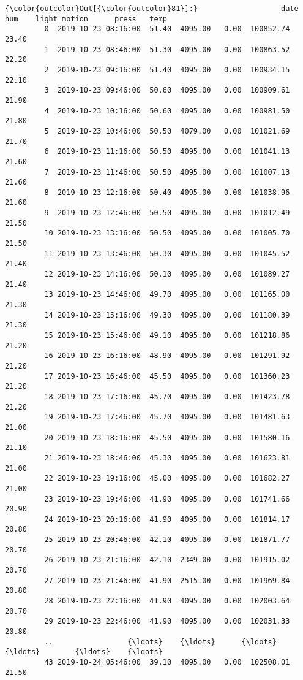 \documentclass[11pt]{article}
\begin{document}
            \begin{Verbatim}[commandchars=\\\{\}]
{\color{outcolor}Out[{\color{outcolor}81}]:}                   date    hum    light motion      press   temp
         0  2019-10-23 08:16:00  51.40  4095.00   0.00  100852.74  23.40
         1  2019-10-23 08:46:00  51.30  4095.00   0.00  100863.52  22.20
         2  2019-10-23 09:16:00  51.40  4095.00   0.00  100934.15  22.10
         3  2019-10-23 09:46:00  50.60  4095.00   0.00  100909.61  21.90
         4  2019-10-23 10:16:00  50.60  4095.00   0.00  100981.50  21.80
         5  2019-10-23 10:46:00  50.50  4079.00   0.00  101021.69  21.70
         6  2019-10-23 11:16:00  50.50  4095.00   0.00  101041.13  21.60
         7  2019-10-23 11:46:00  50.50  4095.00   0.00  101007.13  21.60
         8  2019-10-23 12:16:00  50.40  4095.00   0.00  101038.96  21.60
         9  2019-10-23 12:46:00  50.50  4095.00   0.00  101012.49  21.50
         10 2019-10-23 13:16:00  50.50  4095.00   0.00  101005.70  21.50
         11 2019-10-23 13:46:00  50.30  4095.00   0.00  101045.52  21.40
         12 2019-10-23 14:16:00  50.10  4095.00   0.00  101089.27  21.40
         13 2019-10-23 14:46:00  49.70  4095.00   0.00  101165.00  21.30
         14 2019-10-23 15:16:00  49.30  4095.00   0.00  101180.39  21.30
         15 2019-10-23 15:46:00  49.10  4095.00   0.00  101218.86  21.20
         16 2019-10-23 16:16:00  48.90  4095.00   0.00  101291.92  21.20
         17 2019-10-23 16:46:00  45.50  4095.00   0.00  101360.23  21.20
         18 2019-10-23 17:16:00  45.70  4095.00   0.00  101423.78  21.20
         19 2019-10-23 17:46:00  45.70  4095.00   0.00  101481.63  21.00
         20 2019-10-23 18:16:00  45.50  4095.00   0.00  101580.16  21.10
         21 2019-10-23 18:46:00  45.30  4095.00   0.00  101623.81  21.00
         22 2019-10-23 19:16:00  45.00  4095.00   0.00  101682.27  21.00
         23 2019-10-23 19:46:00  41.90  4095.00   0.00  101741.66  20.90
         24 2019-10-23 20:16:00  41.90  4095.00   0.00  101814.17  20.80
         25 2019-10-23 20:46:00  42.10  4095.00   0.00  101871.77  20.70
         26 2019-10-23 21:16:00  42.10  2349.00   0.00  101915.02  20.70
         27 2019-10-23 21:46:00  41.90  2515.00   0.00  101969.84  20.80
         28 2019-10-23 22:16:00  41.90  4095.00   0.00  102003.64  20.70
         29 2019-10-23 22:46:00  41.90  4095.00   0.00  102031.33  20.80
         ..                 {\ldots}    {\ldots}      {\ldots}    {\ldots}        {\ldots}    {\ldots}
         43 2019-10-24 05:46:00  39.10  4095.00   0.00  102508.01  21.50

\end{Verbatim}
\end{document}
